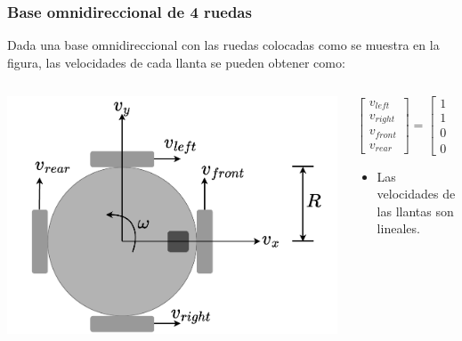 \begin{frame}\frametitle{Base omnidireccional de 4 ruedas}
  Dada una base omnidireccional con las ruedas colocadas como se muestra en la figura, las velocidades de cada llanta se pueden obtener como:
  \[\]
  \begin{columns}
    \begin{column}{0.4\textwidth}
      \includegraphics[width=\textwidth]{Figures/Omnidirectional4wheels.pdf}
    \end{column}
    \begin{column}{0.6\textwidth}
      \[\left[\begin{array}{c}
          v_{left}\\v_{right}\\v_{front}\\v_{rear}
              \end{array}\right] =
        \left[\begin{array}{ccc}
                    1 & 0 & -R\\
                    1 & 0 & +R\\
                    0 & 1 & +R\\
                    0 & 1 & -R
        \end{array}\right]
        \left[\begin{array}{c}
           v_{x}\\v_{y}\\ \omega 
        \end{array}\right]
        \]
  \begin{itemize}
  \item Las velocidades de las llantas son lineales.

\end{itemize}
\end{column}
\end{columns}
\end{frame}
